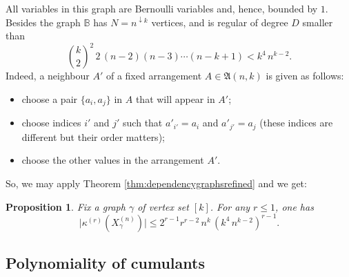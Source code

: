 \documentclass[12pt,a4paper,reqno]{amsart}
\newtheorem{proposition}[lemma]{Proposition}
\theoremstyle{remark}
\newcommand{\SubGraph}{X^{(n)}}
\newcommand{\fall}[1]{^{\downarrow #1}}
\newcommand{\arr}{\mathfrak{A}}
\def\B{\mathbb{B}}
\begin{document}
All variables in this graph are Bernoulli variables and, hence, bounded by $1$. Besides the graph $\B$ has $N=n\fall{ k}$ vertices, and is regular of degree $D$ smaller than 
$$\binom{k}{2}^2  \,2\,  (n-2)(n-3)\cdots(n-k+1) < k^4 \,n^{k-2}.$$ 
Indeed, a neighbour $A'$ of a fixed arrangement $A \in \arr(n,k)$ is given as follows:\vspace{2mm}
\begin{itemize}
    \item choose a pair $\{a_i,a_j\}$ in $A$ that will appear in $A'$;\vspace{2mm}
    \item choose indices $i'$ and $j'$ such that $a'_{i'}=a_i$ and $a'_{j'}=a_j$
        (these indices are different but their order matters);\vspace{2mm}
    \item choose the other values in the arrangement $A'$.\vspace{2mm}
\end{itemize}
So, we may apply Theorem \ref{thm:dependencygraphsrefined} and we get:
\begin{proposition} \label{prop:boundcumulantsubgraph}
Fix a graph $\gamma$ of vertex set $[k]$. For any $r\le 1$, one has
$$ \big| \kappa^{(r)}(\SubGraph_\gamma) \big| \le 2^{r-1} r^{r-2}\,  n^k\, (k^4 \,n^{k-2})^{r-1}. $$
\end{proposition}
\bigskip



\subsection{Polynomiality of cumulants}
\end{document}
